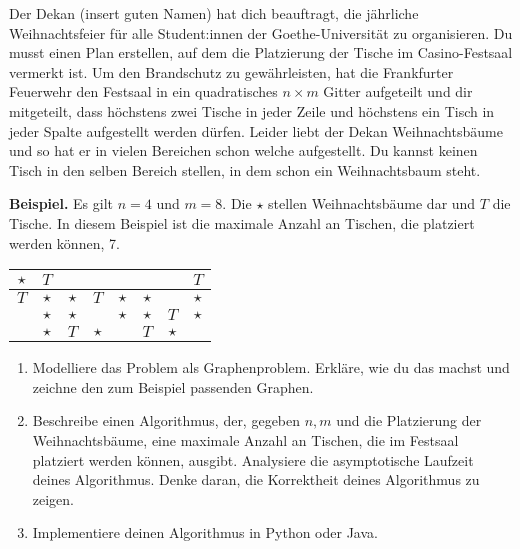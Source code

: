 \documentclass{uebung_cs}
\begin{document}
\begin{aufgabe}[Weihnachtsbäume]
    Der Dekan (insert guten Namen) hat dich beauftragt, die jährliche Weihnachtsfeier für alle Student:innen der Goethe-Universität zu organisieren. Du musst einen Plan erstellen, auf dem die Platzierung der Tische im Casino-Festsaal vermerkt ist. Um den Brandschutz zu gewährleisten, hat die Frankfurter Feuerwehr den Festsaal in ein quadratisches $n \times m$ Gitter aufgeteilt und dir mitgeteilt, dass höchstens zwei Tische in jeder Zeile und höchstens ein Tisch in jeder Spalte aufgestellt werden dürfen. Leider liebt der Dekan Weihnachtsbäume und so hat er in vielen Bereichen schon welche aufgestellt. Du kannst keinen Tisch in den selben Bereich stellen, in dem schon ein Weihnachtsbaum steht.
    
    \textbf{Beispiel.} Es gilt $n = 4$ und $m = 8$. Die $\star$ stellen Weihnachtsbäume dar und $T$ die Tische. In diesem Beispiel ist die maximale Anzahl an Tischen, die platziert werden können, 7.
    
    \vspace{4mm}
    \begin{center}
    \begin{tabular}{|c|c|c|c|c|c|c|c|}
    \hline 
    \rule[-1ex]{0pt}{2.5ex} $\star$ & $T$ &  &  &  &  &  & $T$ \\ 
    \hline 
    \rule[-1ex]{0pt}{2.5ex} $T$ & $\star$ & $\star$ & $T$ & $\star$ & $\star$ &  & $\star$ \\ 
    \hline 
    \rule[-1ex]{0pt}{2.5ex}  & $\star$ & $\star$ &  & $\star$ & $\star$ & $T$ & $\star$ \\ 
    \hline 
    \rule[-1ex]{0pt}{2.5ex}  & $\star$ & $T$ & $\star$ &  & $T$ & $\star$ &  \\ 
    \hline 
    \end{tabular} 
    \end{center}
    \vspace{4mm}
    \begin{enumerate}
    	\item Modelliere das Problem als Graphenproblem. Erkläre, wie du das machst und zeichne den zum Beispiel passenden Graphen.\\
    	\item Beschreibe einen Algorithmus, der, gegeben $n,m$ und die Platzierung der Weihnachtsbäume, eine maximale Anzahl an Tischen, die im Festsaal platziert werden können, ausgibt. Analysiere die asymptotische Laufzeit deines Algorithmus. Denke daran, die Korrektheit deines Algorithmus zu zeigen.\\
    	\item Implementiere deinen Algorithmus in Python oder Java.
    \end{enumerate}
\end{aufgabe}
\end{document}
